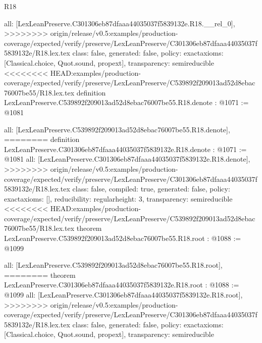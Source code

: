 \begin{lexlean}{R18}
\begin{coremodule}
{{{{{{{{{{{{  all: [LexLeanPreserve.C301306eb87dfaaa44035037f5839132e.R18.__rel_0],
>>>>>>>> origin/release/v0.5:examples/production-coverage/expected/verify/preserve/LexLeanPreserve/C301306eb87dfaaa44035037f5839132e/R18.lex.tex
  class: false,
  generated: false,
  policy: exact{axioms: [Classical.choice, Quot.sound, propext]},
  transparency: semireducible
}
<<<<<<<< HEAD:examples/production-coverage/expected/verify/preserve/LexLeanPreserve/C539892f209013ad52d8ebac76007be55/R18.lex.tex
definition LexLeanPreserve.C539892f209013ad52d8ebac76007be55.R18.denote : @1071 := @1081 {
  all: [LexLeanPreserve.C539892f209013ad52d8ebac76007be55.R18.denote],
========
definition LexLeanPreserve.C301306eb87dfaaa44035037f5839132e.R18.denote : @1071 := @1081 {
  all: [LexLeanPreserve.C301306eb87dfaaa44035037f5839132e.R18.denote],
>>>>>>>> origin/release/v0.5:examples/production-coverage/expected/verify/preserve/LexLeanPreserve/C301306eb87dfaaa44035037f5839132e/R18.lex.tex
  class: false,
  compiled: true,
  generated: false,
  policy: exact{axioms: []},
  reducibility: regular{height: 3},
  transparency: semireducible
}
<<<<<<<< HEAD:examples/production-coverage/expected/verify/preserve/LexLeanPreserve/C539892f209013ad52d8ebac76007be55/R18.lex.tex
theorem LexLeanPreserve.C539892f209013ad52d8ebac76007be55.R18.root : @1088 := @1099 {
  all: [LexLeanPreserve.C539892f209013ad52d8ebac76007be55.R18.root],
========
theorem LexLeanPreserve.C301306eb87dfaaa44035037f5839132e.R18.root : @1088 := @1099 {
  all: [LexLeanPreserve.C301306eb87dfaaa44035037f5839132e.R18.root],
>>>>>>>> origin/release/v0.5:examples/production-coverage/expected/verify/preserve/LexLeanPreserve/C301306eb87dfaaa44035037f5839132e/R18.lex.tex
  class: false,
  generated: false,
  policy: exact{axioms: [Classical.choice, Quot.sound, propext]},
  transparency: semireducible
}

}}}}}}}}}}}}}
\end{coremodule}
\end{lexlean}
